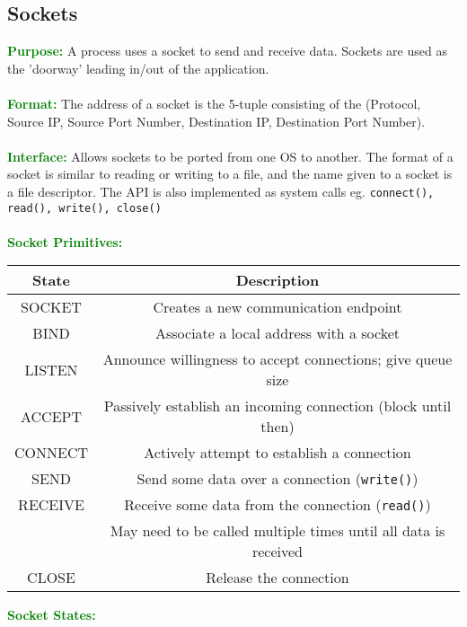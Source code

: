 \documentclass[a4paper,10pt]{article}
\begin{document}
\subsection{Sockets}
\textcolor{Green}{\textbf{Purpose:}} A process uses a socket to send and receive data. Sockets are used as the 'doorway' leading in/out of the application. \\\\
\textcolor{Green}{\textbf{Format:}} The address of a socket is the 5-tuple consisting of the (Protocol, Source IP, Source Port Number, Destination IP, Destination Port Number). \\\\
\textcolor{Green}{\textbf{Interface:}} Allows sockets to be ported from one OS to another. The format of a socket is similar to reading or writing to a file, and the name given to a socket is a file descriptor. The API is also implemented as system calls eg. \texttt{connect(), read(), write(), close()} \\\\
\textcolor{Green}{\textbf{Socket Primitives:}}
\begin{center}
	\begin{tabular}{ |c|c| }
		\hline
		\textbf{State} &\textbf{Description} \\
		\hline 
		\hline
		SOCKET &Creates a new communication endpoint \\
		\hline 
		BIND &Associate a local address with a socket \\
		\hline 
		LISTEN &Announce willingness to accept connections; give queue size \\
		\hline 
		ACCEPT &Passively establish an incoming connection (block until then) \\
		\hline 
		CONNECT &Actively attempt to establish a connection \\ 
		\hline 
		SEND &Send some data over a connection (\texttt{write()}) \\ 
		\hline 
		RECEIVE &Receive some data from the connection (\texttt{read()}) \\
		 &May need to be called multiple times until all data is received \\
		\hline 
		CLOSE &Release the connection \\
		\hline
	\end{tabular}
\end{center}
\newpage
\textcolor{Green}{\textbf{Socket States:}}
\end{document}
